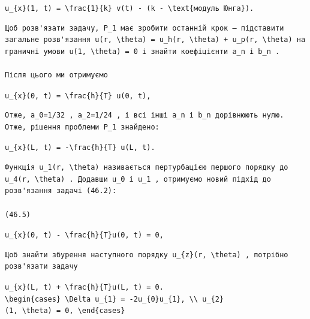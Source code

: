 \documentclass[
  ukrainian,
]{article}
\begin{document}
\texttt{u\_\{x\}(1,\ t)\ =\ \textbackslash{}frac\{1\}\{k\}\ v(t)\ -\ (k\ -\ \textbackslash{}text\{модуль\ Юнга\}).}

\begin{verbatim}
Щоб розв'язати задачу, P_1 має зробити останній крок — підставити загальне розв'язання u(r, \theta) = u_h(r, \theta) + u_p(r, \theta) на граничні умови u(1, \theta) = 0 і знайти коефіцієнти a_n і b_n .

Після цього ми отримуємо
\end{verbatim}

\texttt{u\_\{x\}(0,\ t)\ =\ \textbackslash{}frac\{h\}\{T\}\ u(0,\ t),}

\begin{verbatim}
Отже, a_0=1/32 , a_2=1/24 , і всі інші a_n і b_n дорівнюють нулю. Отже, рішення проблеми P_1 знайдено:
\end{verbatim}

\texttt{u\_\{x\}(L,\ t)\ =\ -\textbackslash{}frac\{h\}\{T\}\ u(L,\ t).}

\begin{verbatim}
Функція u_1(r, \theta) називається пертурбацією першого порядку до u_4(r, \theta) . Додавши u_0 і u_1 , отримуємо новий підхід до розв'язання задачі (46.2):

(46.5)
\end{verbatim}

\texttt{u\_\{x\}(0,\ t)\ -\ \textbackslash{}frac\{h\}\{T\}u(0,\ t)\ =\ 0,}

\begin{verbatim}
Щоб знайти збурення наступного порядку u_{z}(r, \theta) , потрібно розв'язати задачу
\end{verbatim}

\texttt{u\_\{x\}(L,\ t)\ +\ \textbackslash{}frac\{h\}\{T\}u(L,\ t)\ =\ 0.}
\texttt{\textbackslash{}begin\{cases\}\ \textbackslash{}Delta\ u\_\{1\}\ =\ -2u\_\{0\}u\_\{1\},\ \textbackslash{}\textbackslash{}\ u\_\{2\}(1,\ \textbackslash{}theta)\ =\ 0,\ \textbackslash{}end\{cases\}}
\end{document}
